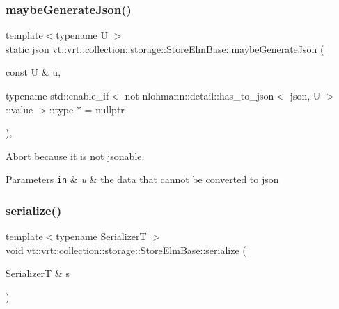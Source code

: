 \subsubsection{\texorpdfstring{maybe\+Generate\+Json()}{maybeGenerateJson()}\hspace{0.1cm}{\footnotesize\ttfamily [2/2]}}
{\footnotesize\ttfamily template$<$typename U $>$ \\
static json vt\+::vrt\+::collection\+::storage\+::\+Store\+Elm\+Base\+::maybe\+Generate\+Json (\begin{DoxyParamCaption}\item[{const U \&}]{u,  }\item[{typename std\+::enable\+\_\+if$<$ not nlohmann\+::detail\+::has\+\_\+to\+\_\+json$<$ json, U $>$\+::value $>$\+::type $\ast$}]{ = {\ttfamily nullptr} }\end{DoxyParamCaption})\hspace{0.3cm}{\ttfamily [inline]}, {\ttfamily [static]}}



Abort because it is not jsonable. 


\begin{DoxyParams}[1]{Parameters}
\mbox{\tt in}  & {\em u} & the data that cannot be converted to json \\
\hline
\end{DoxyParams}
\mbox{\label{structvt_1_1vrt_1_1collection_1_1storage_1_1_store_elm_base_a6552c32f1795ca501635036adc4e21d7}} 
\subsubsection{\texorpdfstring{serialize()}{serialize()}}
{\footnotesize\ttfamily template$<$typename SerializerT $>$ \\
void vt\+::vrt\+::collection\+::storage\+::\+Store\+Elm\+Base\+::serialize (\begin{DoxyParamCaption}\item[{SerializerT \&}]{s }\end{DoxyParamCaption})\hspace{0.3cm}{\ttfamily [inline]}}



